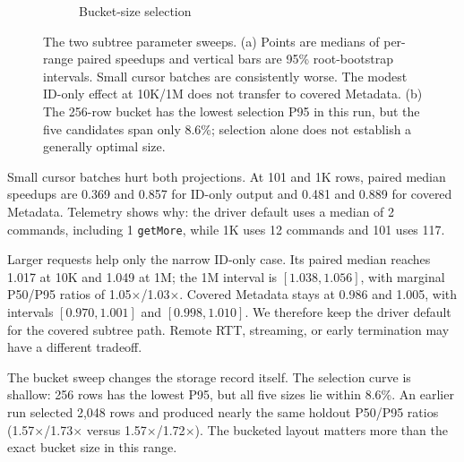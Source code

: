 \documentclass[10pt]{article}
\newcommand{\code}[1]{\texttt{#1}}
\begin{document}
\begin{figure}[H]
\begin{subfigure}[t]{0.48\linewidth}
\caption{Bucket-size selection}
\label{fig:bucket-size-selection}
\end{subfigure}
\caption{The two subtree parameter sweeps. (a) Points are medians of per-range
paired speedups and vertical bars are 95\% root-bootstrap intervals. Small
cursor batches are consistently worse. The modest ID-only effect at 10K/1M
does not transfer to covered Metadata. (b) The 256-row bucket has the lowest
selection P95 in this run, but the five candidates span only 8.6\%; selection
alone does not establish a generally optimal size.}
\label{fig:subtree-sweeps}
\end{figure}

Small cursor batches hurt both projections. At 101 and 1K rows, paired median
speedups are 0.369 and 0.857 for ID-only output and 0.481 and 0.889 for covered
Metadata. Telemetry shows why: the driver default uses a median of 2 commands,
including 1 \code{getMore}, while 1K uses 12 commands and 101 uses 117.

Larger requests help only the narrow ID-only case. Its paired median reaches
1.017 at 10K and 1.049 at 1M; the 1M interval is $[1.038,1.056]$, with
marginal P50/P95 ratios of 1.05$\times$/1.03$\times$. Covered Metadata stays
at 0.986 and 1.005, with intervals $[0.970,1.001]$ and $[0.998,1.010]$.
We therefore keep the driver default for the covered subtree path. Remote RTT,
streaming, or early termination may have a different tradeoff.

The bucket sweep changes the storage record itself. The selection curve is
shallow: 256 rows has the lowest P95, but all five sizes lie within 8.6\%.
An earlier run selected 2{,}048 rows and produced nearly the same holdout
P50/P95 ratios (1.57$\times$/1.73$\times$ versus
1.57$\times$/1.72$\times$). The bucketed layout matters more than the exact
bucket size in this range.
\end{document}

